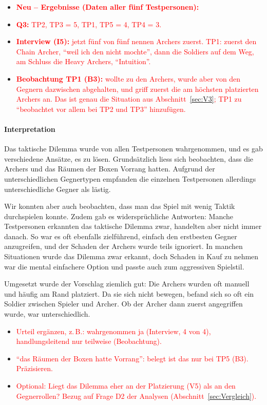 \documentclass[../Main.tex]{subfiles}
\begin{document}
\begin{itemize}[leftmargin=1.5cm]
    \item \textcolor{red}{\textbf{Neu -- Ergebnisse (Daten aller fünf Testpersonen):}}
    \item \textcolor{red}{\textbf{Q3:} TP2, TP3 = 5, TP1, TP5 = 4, TP4 = 3.}
    \item \textcolor{red}{\textbf{Interview (I5):} jetzt fünf von fünf nennen Archers zuerst. TP1: zuerst den Chain Archer, \enquote{weil ich den nicht mochte}, dann die Soldiers auf dem Weg, am Schluss die Heavy Archers, \enquote{Intuition}.}
    \item \textcolor{red}{\textbf{Beobachtung TP1 (B3):} wollte zu den Archers, wurde aber von den Gegnern dazwischen abgehalten, und griff zuerst die am höchsten platzierten Archers an. Das ist genau die Situation aus Abschnitt~\ref{sec:V3}; TP1 zu \enquote{beobachtet vor allem bei TP2 und TP3} hinzufügen.}
\end{itemize}

\paragraph{Interpretation}
Das taktische Dilemma wurde von allen Testpersonen wahrgenommen, und es gab verschiedene Ansätze, es zu lösen. Grundsätzlich liess sich beobachten, dass die Archers und das Räumen der Boxen Vorrang hatten. Aufgrund der unterschiedlichen Gegnertypen empfanden die einzelnen Testpersonen allerdings unterschiedliche Gegner als lästig.

Wir konnten aber auch beobachten, dass man das Spiel mit wenig Taktik durchspielen konnte. Zudem gab es widersprüchliche Antworten: Manche Testpersonen erkannten das taktische Dilemma zwar, handelten aber nicht immer danach. So war es oft ebenfalls zielführend, einfach den erstbesten Gegner anzugreifen, und der Schaden der Archers wurde teils ignoriert. In manchen Situationen wurde das Dilemma zwar erkannt, doch Schaden in Kauf zu nehmen war die mental einfachere Option und passte auch zum aggressiven Spielstil.

Umgesetzt wurde der Vorschlag ziemlich gut: Die Archers wurden oft manuell und häufig am Rand platziert. Da sie sich nicht bewegen, befand sich so oft ein Soldier zwischen Spieler und Archer. Ob der Archer dann zuerst angegriffen wurde, war unterschiedlich.

\begin{itemize}[leftmargin=1.5cm]
    \item \textcolor{red}{Urteil ergänzen, z.\,B.: wahrgenommen ja (Interview, 4 von 4), handlungsleitend nur teilweise (Beobachtung).}
    \item \textcolor{red}{\enquote{das Räumen der Boxen hatte Vorrang}: belegt ist das nur bei TP5 (B3). Präzisieren.}
    \item \textcolor{red}{Optional: Liegt das Dilemma eher an der Platzierung (V5) als an den Gegnerrollen? Bezug auf Frage D2 der Analysen (Abschnitt~\ref{sec:Vergleich}).}
\end{itemize}
\end{document}
